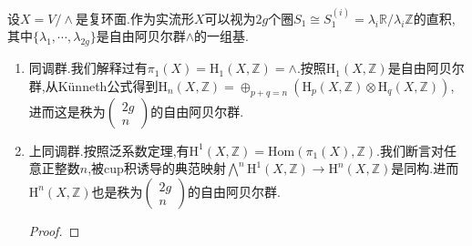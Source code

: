 设$X=V/\wedge$是复环面.作为实流形$X$可以视为$2g$个圈$S_1\cong S_1^{(i)}=\lambda_i\mathbb{R}/\lambda_i\mathbb{Z}$的直积,其中$\{\lambda_1,\cdots,\lambda_{2g}\}$是自由阿贝尔群$\wedge$的一组基.
\begin{enumerate}
	\item 同调群.我们解释过有$\pi_1(X)=\mathrm{H}_1(X,\mathbb{Z})=\wedge$.按照$\mathrm{H}_1(X,\mathbb{Z})$是自由阿贝尔群,从K\"unneth公式得到$\mathrm{H}_n(X,\mathbb{Z})=\oplus_{p+q=n}\left(\mathrm{H}_p(X,\mathbb{Z})\otimes\mathrm{H}_q(X,\mathbb{Z})\right)$,进而这是秩为$\left(\begin{array}{c}2g\\n\end{array}\right)$的自由阿贝尔群.
	\item 上同调群.按照泛系数定理,有$\mathrm{H}^1(X,\mathbb{Z})=\mathrm{Hom}(\pi_1(X),\mathbb{Z})$.我们断言对任意正整数$n$,被cup积诱导的典范映射$\bigwedge^n\mathrm{H}^1(X,\mathbb{Z})\to\mathrm{H}^n(X,\mathbb{Z})$是同构.进而$\mathrm{H}^n(X,\mathbb{Z})$也是秩为$\left(\begin{array}{c}2g\\n\end{array}\right)$的自由阿贝尔群.
	\begin{proof}
		

\end{proof}
\end{enumerate}
